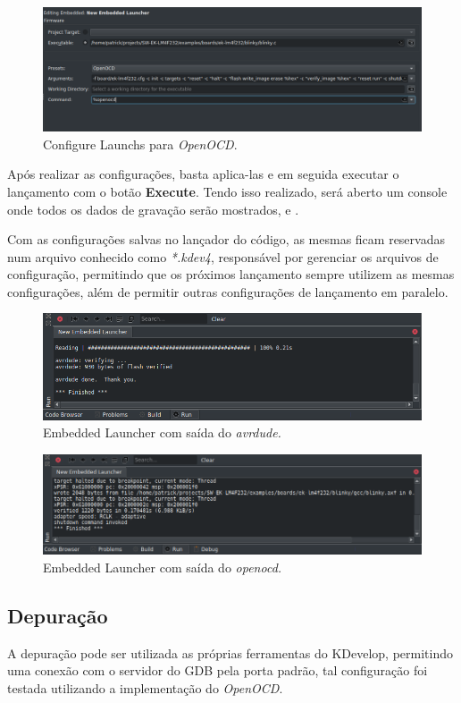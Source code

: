 \begin{figure}[!htb]
  \centering
  \caption[\textit{Configure Launchs} para \textit{OpenOCD}]{Configure Launchs para \textit{OpenOCD}.}
  \label{fig:openocd}
  \includegraphics[width=1\textwidth]{figuras/openocd.png}
\end{figure}

Após realizar as configurações, basta aplica-las e em seguida executar o lançamento com o botão \textbf{Execute}. Tendo isso realizado, será aberto um console onde todos os dados de gravação serão mostrados,  e .

Com as configurações salvas no lançador do código, as mesmas ficam reservadas num arquivo conhecido como \textit{*.kdev4}, responsável por gerenciar os arquivos de configuração, permitindo que os próximos lançamento sempre utilizem as mesmas configurações, além de permitir outras configurações de lançamento em paralelo.

\begin{figure}[!htb]
  \centering
  \caption[\textit{Embedded Launcher} com \textit{avrdude}]{Embedded Launcher com saída do \textit{avrdude.}}
  \label{fig:runavrdude}
  \includegraphics[width=1\textwidth]{figuras/runavrdude.png}
\end{figure}

\begin{figure}[!htb]
  \centering
  \caption[\textit{Embedded Launcher} com \textit{openocd}]{Embedded Launcher com saída do \textit{openocd.}}
  \label{fig:runopenocd}
  \includegraphics[width=1\textwidth]{figuras/runopenocd.png}
\end{figure}

\subsection{Depuração}

A depuração pode ser utilizada as próprias ferramentas do KDevelop, permitindo uma conexão com o servidor do GDB pela porta padrão, tal configuração foi testada utilizando a implementação do \textit{OpenOCD}.

